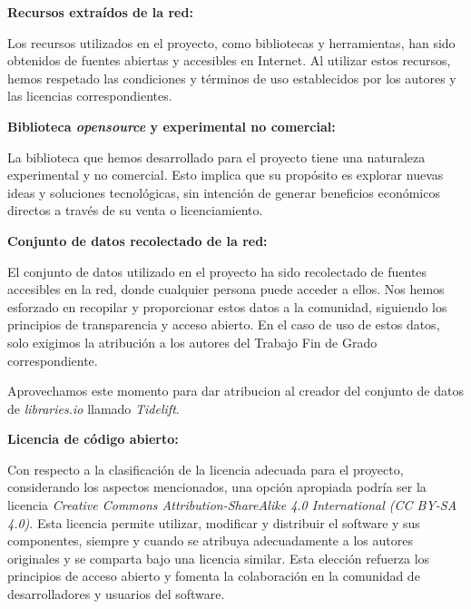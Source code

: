 \textbf{Recursos extraídos de la red:}

Los recursos utilizados en el proyecto, como bibliotecas y herramientas, han sido obtenidos 
de fuentes abiertas y accesibles en Internet. Al utilizar estos recursos, hemos respetado las condiciones y términos de 
uso establecidos por los autores y las licencias correspondientes.

\textbf{Biblioteca \textit{opensource} y experimental no comercial:} 

La biblioteca que hemos desarrollado para el proyecto tiene 
una naturaleza experimental y no comercial. Esto implica que su propósito es explorar nuevas ideas y soluciones tecnológicas, 
sin intención de generar beneficios económicos directos a través de su venta o licenciamiento.

\textbf{Conjunto de datos recolectado de la red:}

El conjunto de datos utilizado en el proyecto ha sido recolectado de fuentes 
accesibles en la red, donde cualquier persona puede acceder a ellos. Nos hemos esforzado en recopilar y proporcionar estos 
datos a la comunidad, siguiendo los principios de transparencia y acceso abierto. En el caso de uso de estos datos, solo 
exigimos la atribución a los autores del Trabajo Fin de Grado correspondiente.

Aprovechamos este momento para dar atribucion al creador del conjunto de datos de \textit{libraries.io} llamado \textit{Tidelift}.

\textbf{Licencia de código abierto:}

Con respecto a la clasificación de la licencia adecuada para el proyecto, considerando los aspectos mencionados, una opción 
apropiada podría ser la licencia \textit{Creative Commons Attribution-ShareAlike 4.0 International (CC BY-SA 4.0)}. Esta licencia 
permite utilizar, modificar y distribuir el software y sus componentes, siempre y cuando se atribuya adecuadamente a los 
autores originales y se comparta bajo una licencia similar. Esta elección refuerza los principios de acceso abierto y 
fomenta la colaboración en la comunidad de desarrolladores y usuarios del software.


